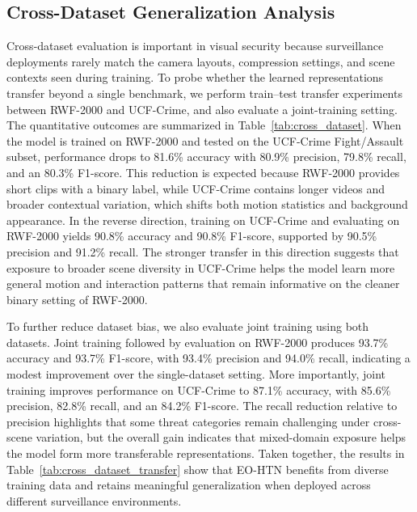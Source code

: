 \documentclass[AMA,Times1COL]{WileyNJDv5} %
\begin{document}
\subsection{Cross-Dataset Generalization Analysis}
Cross-dataset evaluation is important in visual security because surveillance deployments rarely match the camera layouts, compression settings, and scene contexts seen during training. To probe whether the learned representations transfer beyond a single benchmark, we perform train--test transfer experiments between RWF-2000 and UCF-Crime, and also evaluate a joint-training setting. The quantitative outcomes are summarized in Table~\ref{tab:cross_dataset}. When the model is trained on RWF-2000 and tested on the UCF-Crime Fight/Assault subset, performance drops to 81.6\% accuracy with 80.9\% precision, 79.8\% recall, and an 80.3\% F1-score. This reduction is expected because RWF-2000 provides short clips with a binary label, while UCF-Crime contains longer videos and broader contextual variation, which shifts both motion statistics and background appearance. In the reverse direction, training on UCF-Crime and evaluating on RWF-2000 yields 90.8\% accuracy and 90.8\% F1-score, supported by 90.5\% precision and 91.2\% recall. The stronger transfer in this direction suggests that exposure to broader scene diversity in UCF-Crime helps the model learn more general motion and interaction patterns that remain informative on the cleaner binary setting of RWF-2000.

To further reduce dataset bias, we also evaluate joint training using both datasets. Joint training followed by evaluation on RWF-2000 produces 93.7\% accuracy and 93.7\% F1-score, with 93.4\% precision and 94.0\% recall, indicating a modest improvement over the single-dataset setting. More importantly, joint training improves performance on UCF-Crime to 87.1\% accuracy, with 85.6\% precision, 82.8\% recall, and an 84.2\% F1-score. The recall reduction relative to precision highlights that some threat categories remain challenging under cross-scene variation, but the overall gain indicates that mixed-domain exposure helps the model form more transferable representations. Taken together, the results in Table~\ref{tab:cross_dataset_transfer} show that EO-HTN benefits from diverse training data and retains meaningful generalization when deployed across different surveillance environments.
\end{document}
